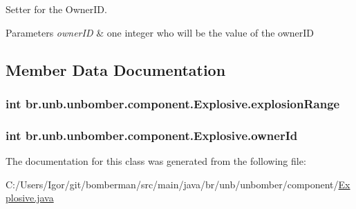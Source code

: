 Setter for the Owner\+I\+D. 


\begin{DoxyParams}{Parameters}
{\em owner\+I\+D} & one integer who will be the value of the owner\+I\+D \\
\hline
\end{DoxyParams}


\subsection{Member Data Documentation}
\hypertarget{classbr_1_1unb_1_1unbomber_1_1component_1_1_explosive_a79e3f764ed1603e84456f09be6356f2c}{
\subsubsection[{explosion\+Range}]{\setlength{\rightskip}{0pt plus 5cm}int br.\+unb.\+unbomber.\+component.\+Explosive.\+explosion\+Range\hspace{0.3cm}{\ttfamily [private]}}}\label{classbr_1_1unb_1_1unbomber_1_1component_1_1_explosive_a79e3f764ed1603e84456f09be6356f2c}
\hypertarget{classbr_1_1unb_1_1unbomber_1_1component_1_1_explosive_aaae830a9fd8d589da39728a3c2a8b5d6}{
\subsubsection[{owner\+Id}]{\setlength{\rightskip}{0pt plus 5cm}int br.\+unb.\+unbomber.\+component.\+Explosive.\+owner\+Id\hspace{0.3cm}{\ttfamily [private]}}}\label{classbr_1_1unb_1_1unbomber_1_1component_1_1_explosive_aaae830a9fd8d589da39728a3c2a8b5d6}


The documentation for this class was generated from the following file\+:\begin{DoxyCompactItemize}
\item 
C\+:/\+Users/\+Igor/git/bomberman/src/main/java/br/unb/unbomber/component/\hyperlink{_explosive_8java}{Explosive.\+java}\end{DoxyCompactItemize}
